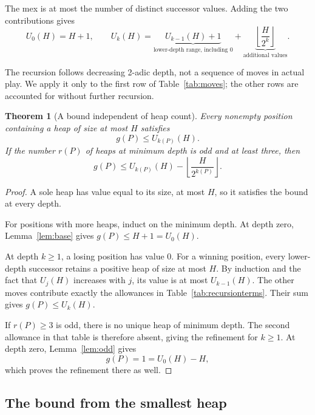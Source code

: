 \documentclass[11pt]{article}
\newtheorem{theorem}{Theorem}[section]
\begin{document}
The mex is at most the number of distinct successor values.
Adding the two contributions gives
\begin{equation}
 U_0(H)=H+1,
 \qquad
 \boxed{
 U_k(H)=
 \underbrace{U_{k-1}(H)+1}_{\text{lower-depth range, including }0}
 +\underbrace{\left\lfloor\frac{H}{2^k}\right\rfloor}_{
 \text{additional values}}.
 }
 \label{eq:recursion}
\end{equation}

The recursion follows decreasing 2-adic depth, not a sequence
of moves in actual play. We apply it only to the first row
of Table~\ref{tab:moves}; the other rows are accounted for
without further recursion.

\begin{theorem}[A bound independent of heap count]
\label{thm:bound}
Every nonempty position containing a heap of size at most $H$
satisfies
\[
 g(P)\le U_{k(P)}(H).
\]
If the number $r(P)$ of heaps at minimum depth is odd and at
least three, then
\begin{equation}
 g(P)\le
 U_{k(P)}(H)
 -
 \left\lfloor\frac{H}{2^{k(P)}}\right\rfloor.
 \label{eq:refined}
\end{equation}
\end{theorem}

\begin{proof}
A sole heap has value equal to its size, at most $H$, so it
satisfies the bound at every depth.

For positions with more heaps, induct on the minimum depth.
At depth zero, Lemma~\ref{lem:base} gives
$g(P)\le H+1=U_0(H)$.

At depth $k\ge1$, a losing position has value $0$.
For a winning position, every lower-depth successor retains
a positive heap of size at most $H$. By induction and the
fact that $U_j(H)$ increases with $j$, its value is at most
$U_{k-1}(H)$. The other moves contribute exactly the allowances
in Table~\ref{tab:recursionterms}. Their sum gives
$g(P)\le U_k(H)$.

If $r(P)\ge3$ is odd, there is no unique heap of minimum depth.
The second allowance in that table is therefore absent, giving
the refinement for $k\ge1$. At depth zero, Lemma~\ref{lem:odd}
gives
\[
 g(P)=1=U_0(H)-H,
\]
which proves the refinement there as well.
\end{proof}

\subsection{The bound from the smallest heap}
\end{document}
